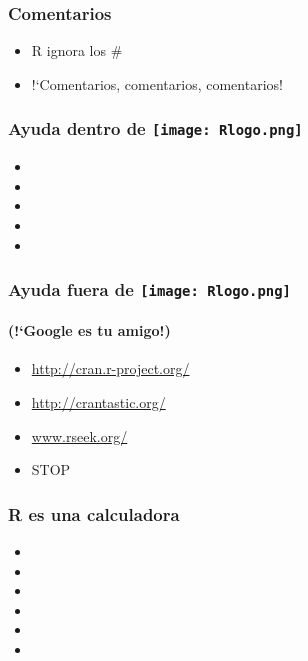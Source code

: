 \documentclass[mathserif]{beamer}
\newcommand{\Rlogo}{\protect\texttt{[image: Rlogo.png]}}%
\begin{document}
\begin{frame}[plain,label=d7]%
   \frametitle{Comentarios}
   \begin{itemize}
      \item R ignora los $\#$
      \item !`Comentarios, comentarios, comentarios!
   \end{itemize}
\end{frame}%

\begin{frame}[plain,label=d7bis]%
\frametitle{Ayuda dentro de \Rlogo}
\begin{itemize}
   \item {}
   \item {}
   \item {}
   \item {}
   \item {}
\end{itemize}
\end{frame}%

\begin{frame}[plain,label=d8]%
   \frametitle{Ayuda fuera de \Rlogo}
   \framesubtitle{(!`Google es tu amigo!)}
   \begin{itemize}
      \item \url{http://cran.r-project.org/}
      \item \url{http://crantastic.org/}
      \item \url{www.rseek.org/}
      \item \url{} STOP
   \end{itemize}
\end{frame}%

\begin{frame}[plain,label=d9]%
   \frametitle{R es una calculadora}
   \begin{itemize}
      \item {}
      \item {}
      \item {}
      \item {}
      \item {}
      \item {}
   \end{itemize}
\end{frame}%
\end{document}
